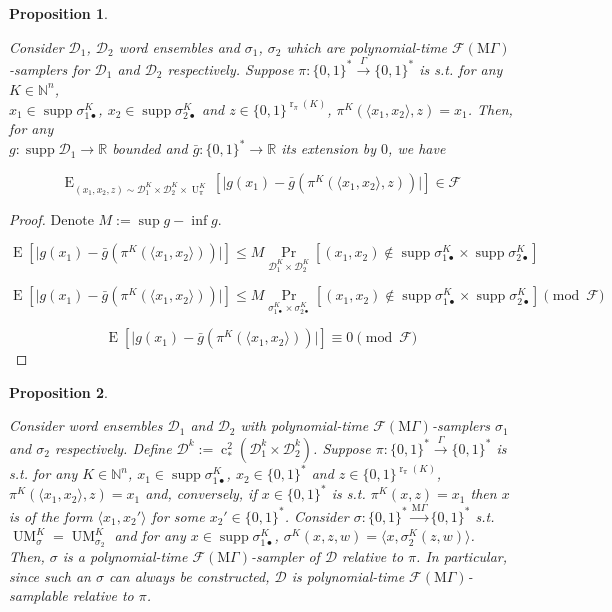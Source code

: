 \documentclass[11pt]{article}
\numberwithin{equation}{section}
\theoremstyle{definition}
\theoremstyle{plain}
\newtheorem{proposition}{Proposition}[section]
\newcommand{\Bool}{\{0,1\}}
\newcommand{\Words}{{\Bool^*}}
\DeclareMathOperator{\Supp}{supp}
\DeclareMathOperator{\Prb}{Pr}
\DeclareMathOperator{\E}{E}
\DeclareMathOperator{\R}{r}
\DeclareMathOperator{\UM}{UM}
\DeclareMathOperator{\Un}{U}
\DeclareMathOperator{\En}{c}
\newcommand{\Nats}{\mathbb{N}}
\newcommand{\Reals}{\mathbb{R}}
\newcommand{\Abs}[1]{\lvert #1 \rvert}
\newcommand{\Chev}[1]{\langle #1 \rangle}
\newcommand{\Dist}{\mathcal{D}}
\newcommand{\MGrow}{\mathrm{M}\Gamma}
\newcommand{\Fall}{\mathcal{F}}
\newcommand{\EMG}{\Fall(\MGrow)}
\newcommand{\Scheme}{\xrightarrow{\Gamma}}
\newcommand{\MScheme}{\xrightarrow{\MGrow}}
\begin{document}
\begin{samepage}
\begin{proposition}
\label{prp:thm__mult__cond2}

Consider $\Dist_1$, $\Dist_2$ word ensembles and $\sigma_1$, $\sigma_2$ which are polynomial-time $\EMG$-samplers for $\Dist_1$ and $\Dist_2$ respectively. Suppose $\pi: \Words \Scheme \Words$ is s.t. for any $K \in \Nats^n$,\\ $x_1 \in \Supp \sigma_{1\bullet}^{K}$, ${x_2 \in \Supp \sigma_{2\bullet}^{K}}$ and $z \in \Bool^{\R_\pi(K)}$, $\pi^{K}(\Chev{x_1,x_2},z)=x_1$. Then, for any\\ $g: \Supp \Dist_1 \rightarrow \Reals$ bounded and ${\bar{g}: \Words \rightarrow \Reals}$ its extension by ${0}$, we have 

$$\E_{(x_1,x_2,z) \sim\Dist_1^{K} \times \Dist_2^{K} \times \Un_\pi^{K}}[\Abs{g(x_1)-\bar{g}(\pi^{K}(\Chev{x_1,x_2},z))}] \in \Fall$$

\end{proposition}
\end{samepage}

\begin{proof}

Denote $M:= \sup g - \inf g$.

$$\E[\Abs{g(x_1)-\bar{g}(\pi^{K}(\Chev{x_1,x_2}))}] \leq M \Prb_{ \Dist_1^{K} \times \Dist_2^{K}}[(x_1,x_2) \not\in \Supp \sigma_{1\bullet}^{K} \times \Supp \sigma_{2\bullet}^{K}]$$

$$\E[\Abs{g(x_1)-\bar{g}(\pi^{K}(\Chev{x_1,x_2}))}] \leq M\Prb_{ \sigma_{1\bullet}^{K} \times \sigma_{2\bullet}^{K}}[(x_1,x_2) \not\in \Supp \sigma_{1\bullet}^{K} \times \Supp \sigma_{2\bullet}^{K}] \pmod \Fall$$

$$\E[\Abs{g(x_1)-\bar{g}(\pi^{K}(\Chev{x_1,x_2}))}] \equiv 0 \pmod \Fall$$
\end{proof}
\begin{samepage}
\begin{proposition}
\label{prp:smp_base_change}

Consider word ensembles $\Dist_1$ and $\Dist_2$ with polynomial-time $\EMG$-samplers $\sigma_1$ and $\sigma_2$ respectively. Define ${\Dist^k:=\En_*^2(\Dist_1^k \times \Dist_2^k)}$. Suppose ${\pi: \Words \Scheme \Words}$ is s.t. for any $K \in \Nats^n$, ${x_1 \in \Supp \sigma_{1\bullet}^{K}}$, ${x_2 \in \Words}$ and $z \in \Bool^{\R_\pi(K)}$, ${\pi^{K}(\Chev{x_1,x_2},z)=x_1}$ and, conversely, if ${x \in \Words}$ is s.t. ${\pi^K(x,z)=x_1}$ then ${x}$ is of the form ${\Chev{x_1,x_2'}}$ for some ${x_2' \in \Words}$. Consider ${\sigma: \Words \MScheme \Words}$ s.t. $\UM_\sigma^{K}=\UM_{\sigma_2}^{K}$ and for any $x \in \Supp \sigma_{1\bullet}^{K}$, ${\sigma^{K}(x,z,w)=\Chev{x,\sigma_2^{K}(z,w)}}$. Then, $\sigma$ is a polynomial-time $\EMG$-sampler of $\Dist$ relative to $\pi$. In particular, since such an $\sigma$ can always be constructed, $\Dist$ is polynomial-time $\EMG$-samplable relative to $\pi$.

\end{proposition}
\end{samepage}
\end{document}
